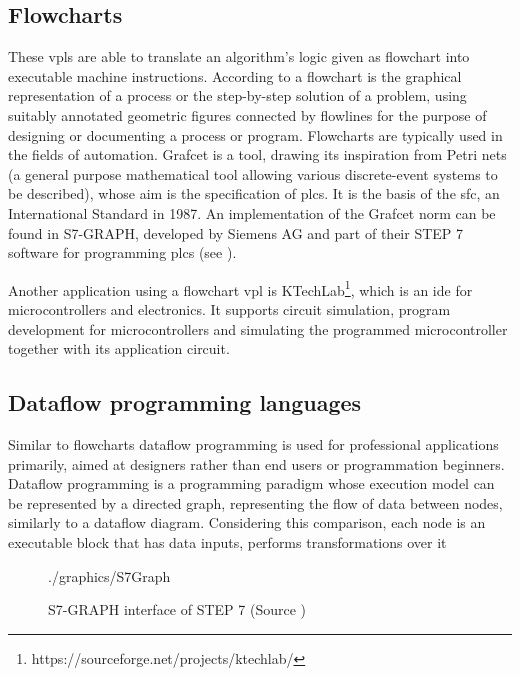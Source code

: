 \subsection{Flowcharts}
These \glspl{vpl} are able to translate an algorithm's logic given as flowchart into executable machine instructions. According to \cite{ISO2382} a flowchart is the graphical representation of a process or the step-by-step solution of a problem, using suitably annotated geometric figures connected by flowlines for the purpose of designing or documenting a process or program. Flowcharts are typically used in the fields of automation. Grafcet \cite{Grafcet} is a tool, drawing its inspiration from Petri nets (a general purpose mathematical tool allowing various discrete-event systems to be described), whose aim is the specification of \glspl{plc}. It is the basis of the \gls{sfc}, an International Standard in 1987. An implementation of the Grafcet norm can be found in S7-GRAPH, developed by Siemens AG and part of their STEP 7 software for programming \glspl{plc} (see ).

Another application using a flowchart \gls{vpl} is KTechLab\footnote{https://sourceforge.net/projects/ktechlab/}, which is an \gls{ide} for microcontrollers and electronics. It supports circuit simulation, program development for microcontrollers and simulating the programmed microcontroller together with its application circuit.

\subsection{Dataflow programming languages}
Similar to flowcharts dataflow programming is used for professional applications primarily, aimed at designers rather than end users or programmation beginners. Dataflow programming is a programming paradigm whose execution model can be represented by a directed graph, representing the flow of data between nodes, similarly to a dataflow diagram. Considering this comparison, each node is an executable block that has data inputs, performs transformations over it

\begin{figure}[!h]
	\centering
	\begin{overpic}[width=0.65\linewidth]{./graphics/S7Graph}
	\end{overpic}
    \caption[S7-GRAPH interface of  STEP 7]%
        {S7-GRAPH interface of  STEP 7 (Source \footnotemark)}
	\label{fig:S7Graph}%
\end{figure}


